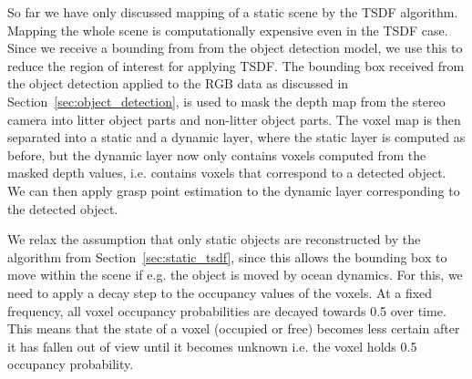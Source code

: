 So far we have only discussed mapping of a static scene by the \gls{TSDF} algorithm. Mapping the whole scene is computationally expensive even in the \gls{TSDF} case. Since we receive a bounding from from the object detection model, we use this to reduce the region of interest for applying \gls{TSDF}. The bounding box received from the object detection applied to the RGB data as discussed in Section~\ref{sec:object_detection}, is used to mask the depth map from the stereo camera into litter object parts and non-litter object parts. The voxel map is then separated into a static and a dynamic layer, where the static layer is computed as before, but the dynamic layer now only contains voxels computed from the masked depth values, i.e. contains voxels that correspond to a detected object. We can then apply grasp point estimation to the dynamic layer corresponding to the detected object. 

We relax the assumption that only static objects are reconstructed by the algorithm from Section~\ref{sec:static_tsdf}, since this allows the bounding box to move within the scene if e.g. the object is moved by ocean dynamics. For this, we need to apply a decay step to the occupancy values of the voxels. At a fixed frequency, all voxel occupancy probabilities are decayed towards 0.5 over time. This means that the state of a voxel (occupied or free) becomes less certain after it has fallen out of view until it becomes unknown i.e. the voxel holds 0.5 occupancy probability. 

